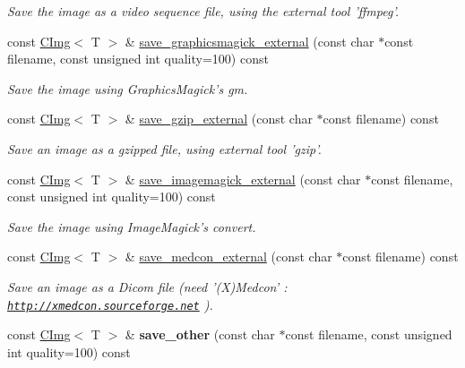 \begin{DoxyCompactItemize}
\begin{DoxyCompactList}\small\item\em Save the image as a video sequence file, using the external tool 'ffmpeg'. \item\end{DoxyCompactList}\item 
const \hyperlink{structcimg__library_1_1CImg}{CImg}$<$ T $>$ \& \hyperlink{structcimg__library_1_1CImg_afdab21cdc4ef778bfaf4e123b28c9aa0}{save\_\-graphicsmagick\_\-external} (const char $\ast$const filename, const unsigned int quality=100) const 
\begin{DoxyCompactList}\small\item\em Save the image using GraphicsMagick's gm. \item\end{DoxyCompactList}\item 
\hypertarget{structcimg__library_1_1CImg_a882ef6fb0c2487da8598e36c45b8eeab}{
const \hyperlink{structcimg__library_1_1CImg}{CImg}$<$ T $>$ \& \hyperlink{structcimg__library_1_1CImg_a882ef6fb0c2487da8598e36c45b8eeab}{save\_\-gzip\_\-external} (const char $\ast$const filename) const }
\label{structcimg__library_1_1CImg_a882ef6fb0c2487da8598e36c45b8eeab}

\begin{DoxyCompactList}\small\item\em Save an image as a gzipped file, using external tool 'gzip'. \item\end{DoxyCompactList}\item 
const \hyperlink{structcimg__library_1_1CImg}{CImg}$<$ T $>$ \& \hyperlink{structcimg__library_1_1CImg_ab0ff4f35fc74d40fda4893b7e2fdbe7b}{save\_\-imagemagick\_\-external} (const char $\ast$const filename, const unsigned int quality=100) const 
\begin{DoxyCompactList}\small\item\em Save the image using ImageMagick's convert. \item\end{DoxyCompactList}\item 
\hypertarget{structcimg__library_1_1CImg_af3608edc3098e7c850c69cd347d4f9e8}{
const \hyperlink{structcimg__library_1_1CImg}{CImg}$<$ T $>$ \& \hyperlink{structcimg__library_1_1CImg_af3608edc3098e7c850c69cd347d4f9e8}{save\_\-medcon\_\-external} (const char $\ast$const filename) const }
\label{structcimg__library_1_1CImg_af3608edc3098e7c850c69cd347d4f9e8}

\begin{DoxyCompactList}\small\item\em Save an image as a Dicom file (need '(X)Medcon' : \href{http://xmedcon.sourceforge.net}{\tt http://xmedcon.sourceforge.net} ). \item\end{DoxyCompactList}\item 
\hypertarget{structcimg__library_1_1CImg_a3c48c6414547b87d5b3dbf17ac84b393}{
const \hyperlink{structcimg__library_1_1CImg}{CImg}$<$ T $>$ \& {\bfseries save\_\-other} (const char $\ast$const filename, const unsigned int quality=100) const }
\label{structcimg__library_1_1CImg_a3c48c6414547b87d5b3dbf17ac84b393}


\end{DoxyCompactItemize}
